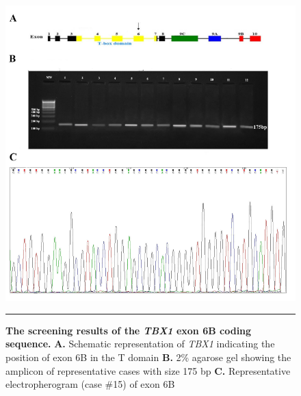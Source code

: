 \begin{refsection}
\begin{figure}[!tb]
\centering
\includegraphics[width=\linewidth]{Figures/Figure4_8TBX6B.pdf}
\rule{35em}{0.5pt}
\caption[The screening results of the \textit{TBX1} exon 6B coding sequence]{\textbf{The screening results of the \textit{TBX1} exon 6B coding sequence.}
\textbf{A.} Schematic representation of \textit{TBX1} indicating the position of exon 6B in the T domain \textbf{B.} 2\% agarose gel showing the amplicon of representative cases with size 175 bp \textbf{C.} Representative electropherogram (case \#15) of exon 6B}
\label{fig:4_8}
\end{figure}


\end{refsection}

